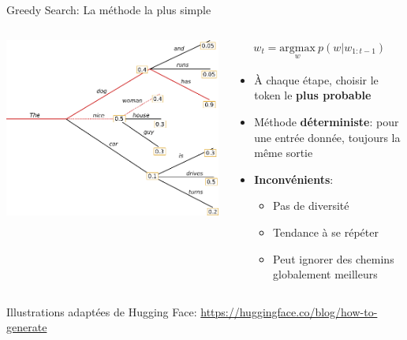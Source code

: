 \documentclass[aspectratio=169]{beamer}
\begin{document}
\begin{frame}{Greedy Search: La méthode la plus simple}
    \begin{columns}
        \begin{column}{0.5\textwidth}
            \begin{center}
                \includegraphics[width=\textwidth]{images/beam.png}
            \end{center}
        \end{column}
        \begin{column}{0.5\textwidth}
            \begin{align*}
                w_t = \underset{w}{\text{argmax}} \ p(w|w_{1:t-1})
            \end{align*}
            \begin{itemize}
                \item À chaque étape, choisir le token le \textbf{plus probable}
                \item Méthode \textbf{déterministe}: pour une entrée donnée, toujours la même sortie
                \item \textbf{Inconvénients}:
                \begin{itemize}
                    \item Pas de diversité
                    \item Tendance à se répéter
                    \item Peut ignorer des chemins globalement meilleurs
                \end{itemize}
            \end{itemize}
        \end{column}
    \end{columns}
    \vspace{0.3cm}
    \begin{center}
        \footnotesize{Illustrations adaptées de Hugging Face: \url{https://huggingface.co/blog/how-to-generate}}
    \end{center}
\end{frame}
\end{document}
